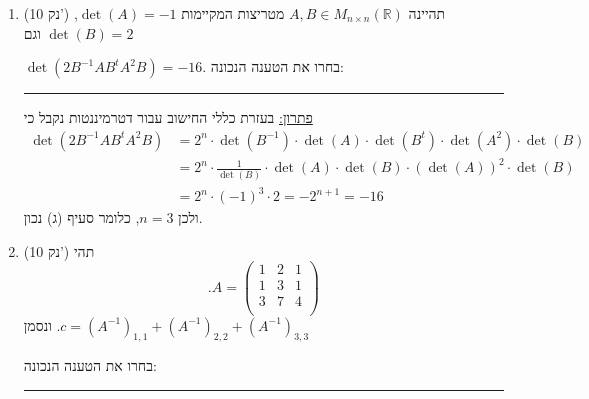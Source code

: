 \documentclass[12pt, a4paper]{article}
\newcommand{\ntn}{n\times n}
\newcommand{\rr}{\mathbb{R}}
\newcommand{\points}[1]{(#1 נק') }
\begin{document}
\begin{enumerate}
\item\points{10}
תהיינה
$A,B\in M_{\ntn}(\rr)$
מטריצות המקיימות
$\det(A)=-1$,
$\det(B)=2$
וגם

$\det(2B^{-1}AB^tA^2B)=-16$.
בחרו את הטענה הנכונה:
\begin{enumerate}
\end{enumerate}


\noindent\rule{16cm}{0.4pt}

\underline{פתרון:}
בעזרת כללי החישוב עבור דטרמיננטות נקבל כי
\begin{align*}
\det(2B^{-1}AB^tA^2B)
&=2^n\cdot \det(B^{-1})\cdot\det(A)\cdot\det(B^t)\cdot\det(A^2)\cdot\det(B)
\\&=2^n\cdot
\frac{1}{\det(B)}\cdot
\det(A)\cdot
\det(B)\cdot
(\det(A))^2\cdot \det(B)
\\&=2^n\cdot (-1)^3\cdot 2=-2^{n+1}=-16
\end{align*}
ולכן 
$n=3$,
כלומר סעיף (ג) נכון.

\newpage


\item\points{10}
תהי
$$.A=\begin{pmatrix}
1&2&1\\
1&3&1\\
3&7&4\\
\end{pmatrix}$$
ונסמן
$.c= (A^{-1})_{1,1}+(A^{-1})_{2,2}+(A^{-1})_{3,3}$

בחרו את הטענה הנכונה:
\begin{enumerate}
\end{enumerate}

\noindent\rule{16cm}{0.4pt}


\end{enumerate}
\end{document}

